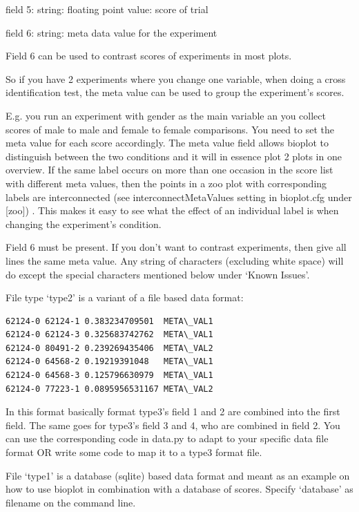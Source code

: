 \documentclass[letterpaper,10pt,english]{sphinxmanual}
\begin{document}
field 5: string: floating point value: score of trial

field 6: string: meta data value for the experiment

Field 6 can be used to contrast scores of experiments in most plots.

So if you have 2 experiments where you change one variable, when doing a cross
identification test, the meta value can be used to group the experiment's scores.

E.g. you run an experiment with gender as the main variable an you collect scores of male
to male and female to female comparisons. You need to set the meta value for each score
accordingly. The meta value field allows bioplot to distinguish
between the two conditions and it will in essence plot 2 plots in one overview.
If the same label occurs on more than one occasion in the score list with different meta
values, then the points in a zoo plot with corresponding labels are interconnected
(see interconnectMetaValues setting in bioplot.cfg under {[}zoo{]}) . This makes it easy
to see what the effect of an individual label is when changing the experiment's condition.

Field 6 must be present. If you don't want to contrast experiments, then give all lines
the same meta value. Any string of characters (excluding white space) will do except
the special characters mentioned below under `Known Issues'.

File type `type2' is a variant of a file based data format:

\begin{Verbatim}[commandchars=\\\{\}]
62124-0 62124-1 0.383234709501  META\_VAL1
62124-0 62124-3 0.325683742762  META\_VAL1
62124-0 80491-2 0.239269435406  META\_VAL2
62124-0 64568-2 0.19219391048   META\_VAL1
62124-0 64568-3 0.125796630979  META\_VAL1
62124-0 77223-1 0.0895956531167 META\_VAL2
\end{Verbatim}

In this format basically format type3's field 1 and 2 are combined into the first field.
The same goes for type3's field 3 and 4, who are combined in field 2. You can use the corresponding code in data.py to adapt to your specific data file format OR write some code to map it to a type3 format file.

File `type1' is a database (sqlite) based data format and meant as an example on how to
use bioplot in combination with a database of scores. Specify `database' as filename on the
command line.
\end{document}
